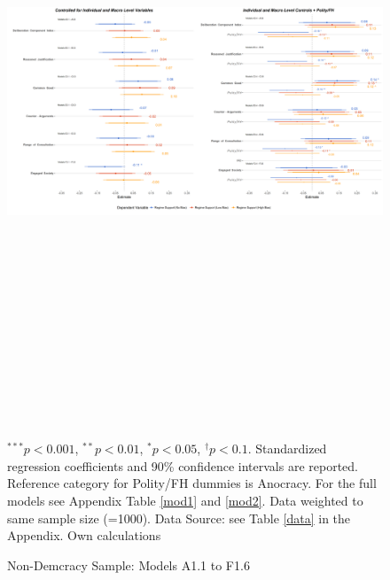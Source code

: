 \documentclass[]{article}
\begin{document}
\begin{landscape}
    \begin{figure}
        \caption{Non-Demcracy Sample: Models A1.1 to F1.6}
        \label{reg3}
        \includegraphics[width=690pt,height=530pt]{images/coefplot_nondem.png}
        \flushright
        {\scriptsize $^{***}p<0.001$, $^{**}p<0.01$, $^*p<0.05$, $^{\dagger}p<0.1$. Standardized regression coefficients and 90\% confidence intervals are reported. Reference category for Polity/FH dummies is Anocracy. For the full models see Appendix Table \ref{mod1} and \ref{mod2}. Data weighted to same sample size (=1000). Data Source: see Table \ref{data} in the Appendix. Own calculations  \par}
    \end{figure}
\end{landscape}
\end{document}
